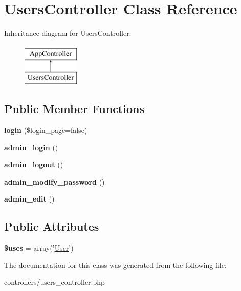 \hypertarget{class_users_controller}{
\section{\-Users\-Controller \-Class \-Reference}
\label{class_users_controller}
}
\-Inheritance diagram for \-Users\-Controller\-:\begin{figure}[H]
\begin{center}
\leavevmode
\includegraphics[height=2.000000cm]{class_users_controller}
\end{center}
\end{figure}
\subsection*{\-Public \-Member \-Functions}
\begin{DoxyCompactItemize}
\item 
\hypertarget{class_users_controller_a9cce4783fdaec2146254f7fcbc4f2202}{
{\bfseries login} (\$login\-\_\-page=false)}
\label{class_users_controller_a9cce4783fdaec2146254f7fcbc4f2202}

\item 
\hypertarget{class_users_controller_a03696a2e7833d08eaf59c6ac2348da19}{
{\bfseries admin\-\_\-login} ()}
\label{class_users_controller_a03696a2e7833d08eaf59c6ac2348da19}

\item 
\hypertarget{class_users_controller_a4865765904b4acc6694e4f4b5a4faf3a}{
{\bfseries admin\-\_\-logout} ()}
\label{class_users_controller_a4865765904b4acc6694e4f4b5a4faf3a}

\item 
\hypertarget{class_users_controller_a09ef09718869f50b3e4768f2768aefef}{
{\bfseries admin\-\_\-modify\-\_\-password} ()}
\label{class_users_controller_a09ef09718869f50b3e4768f2768aefef}

\item 
\hypertarget{class_users_controller_a44b60e66c2b980651630cc3478155af0}{
{\bfseries admin\-\_\-edit} ()}
\label{class_users_controller_a44b60e66c2b980651630cc3478155af0}

\end{DoxyCompactItemize}
\subsection*{\-Public \-Attributes}
\begin{DoxyCompactItemize}
\item 
\hypertarget{class_users_controller_ad43b1a8749a2ced5581bacbbd8239182}{
{\bfseries \$uses} = array('\hyperlink{class_user}{\-User}')}
\label{class_users_controller_ad43b1a8749a2ced5581bacbbd8239182}

\end{DoxyCompactItemize}


\-The documentation for this class was generated from the following file\-:\begin{DoxyCompactItemize}
\item 
controllers/users\-\_\-controller.\-php\end{DoxyCompactItemize}

